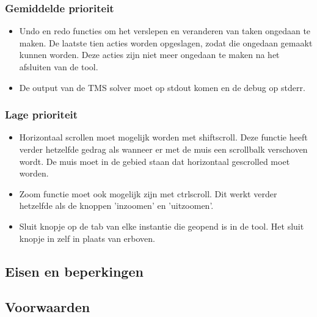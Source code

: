 \subsubsection*{Gemiddelde prioriteit}
\begin{itemize}
	\item Undo en redo functies om het verslepen en veranderen van taken ongedaan te maken. De laatste tien acties worden opgeslagen, zodat die ongedaan gemaakt kunnen worden. Deze acties zijn niet meer ongedaan te maken na het afsluiten van de tool. 
	\item De output van de TMS solver moet op stdout komen en de debug op stderr.
\end{itemize}

\subsubsection*{Lage prioriteit}
\begin{itemize}
	\item Horizontaal scrollen moet mogelijk worden met shift\plus scroll. Deze functie heeft verder hetzelfde gedrag als wanneer er met de muis een scrollbalk verschoven wordt. De muis moet in de gebied staan dat horizontaal gescrolled moet worden. 
	\item Zoom functie moet ook mogelijk zijn met ctrl\plus scroll. Dit werkt verder hetzelfde als de knoppen 'inzoomen' en 'uitzoomen'.
	\item Sluit knopje op de tab van elke instantie die geopend is in de tool. Het sluit knopje in  zelf in plaats van erboven.
\end{itemize}



\subsection{Eisen en beperkingen}


\subsection{Voorwaarden}
